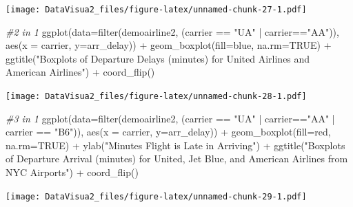 \documentclass[
]{article}
\newenvironment{Shaded}{\begin{snugshade}}{\end{snugshade}}
\newcommand{\AttributeTok}[1]{\textcolor[rgb]{0.77,0.63,0.00}{#1}}
\newcommand{\CommentTok}[1]{\textcolor[rgb]{0.56,0.35,0.01}{\textit{#1}}}
\newcommand{\ConstantTok}[1]{\textcolor[rgb]{0.00,0.00,0.00}{#1}}
\newcommand{\FunctionTok}[1]{\textcolor[rgb]{0.00,0.00,0.00}{#1}}
\newcommand{\NormalTok}[1]{#1}
\newcommand{\SpecialCharTok}[1]{\textcolor[rgb]{0.00,0.00,0.00}{#1}}
\newcommand{\StringTok}[1]{\textcolor[rgb]{0.31,0.60,0.02}{#1}}
\begin{document}
\texttt{[image: DataVisua2\_files/figure-latex/unnamed-chunk-27-1.pdf]}

\begin{Shaded}
\begin{Highlighting}[]
\CommentTok{\#2 in 1}
\FunctionTok{ggplot}\NormalTok{(}\AttributeTok{data=}\FunctionTok{filter}\NormalTok{(demoairline2, (carrier }\SpecialCharTok{==} \StringTok{"UA"} \SpecialCharTok{|}\NormalTok{ carrier}\SpecialCharTok{==}\StringTok{"AA"}\NormalTok{)), }\FunctionTok{aes}\NormalTok{(}\AttributeTok{x =}\NormalTok{ carrier, }\AttributeTok{y=}\NormalTok{arr\_delay)) }\SpecialCharTok{+} \FunctionTok{geom\_boxplot}\NormalTok{(}\AttributeTok{fill=}\StringTok{\textquotesingle{}blue\textquotesingle{}}\NormalTok{, }\AttributeTok{na.rm=}\ConstantTok{TRUE}\NormalTok{) }\SpecialCharTok{+} \FunctionTok{ggtitle}\NormalTok{(}\StringTok{"Boxplots of Departure Delays (minutes) for United Airlines and American Airlines"}\NormalTok{) }\SpecialCharTok{+} \FunctionTok{coord\_flip}\NormalTok{()}
\end{Highlighting}
\end{Shaded}

\texttt{[image: DataVisua2\_files/figure-latex/unnamed-chunk-28-1.pdf]}

\begin{Shaded}
\begin{Highlighting}[]
\CommentTok{\#3 in 1}
\FunctionTok{ggplot}\NormalTok{(}\AttributeTok{data=}\FunctionTok{filter}\NormalTok{(demoairline2, (carrier }\SpecialCharTok{==} \StringTok{"UA"} \SpecialCharTok{|}\NormalTok{ carrier}\SpecialCharTok{==}\StringTok{"AA"} \SpecialCharTok{|}\NormalTok{ carrier }\SpecialCharTok{==} \StringTok{"B6"}\NormalTok{)), }\FunctionTok{aes}\NormalTok{(}\AttributeTok{x =}\NormalTok{ carrier, }\AttributeTok{y=}\NormalTok{arr\_delay)) }\SpecialCharTok{+} \FunctionTok{geom\_boxplot}\NormalTok{(}\AttributeTok{fill=}\StringTok{\textquotesingle{}red\textquotesingle{}}\NormalTok{, }\AttributeTok{na.rm=}\ConstantTok{TRUE}\NormalTok{) }\SpecialCharTok{+} \FunctionTok{ylab}\NormalTok{(}\StringTok{"Minutes Flight is Late in Arriving"}\NormalTok{) }\SpecialCharTok{+} \FunctionTok{ggtitle}\NormalTok{(}\StringTok{"Boxplots of Departure Arrival (minutes) for United, Jet Blue, and American Airlines from NYC Airports"}\NormalTok{)  }\SpecialCharTok{+} \FunctionTok{coord\_flip}\NormalTok{()}
\end{Highlighting}
\end{Shaded}

\texttt{[image: DataVisua2\_files/figure-latex/unnamed-chunk-29-1.pdf]}
\end{document}
